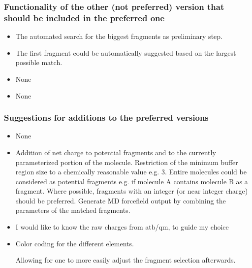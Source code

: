 \subsubsection{Functionality of the other (not preferred) version that should be included in the preferred one}
\begin{itemize}
\item The automated search for the biggest fragments as preliminary step.

\item The first fragment could be automatically suggested based on the largest possible match.

\item None

\item None

\end{itemize}


\subsubsection{Suggestions for additions to the preferred versions}
\begin{itemize}
\item None

\item Addition of net charge to potential fragments and to the currently parameterized portion of the molecule. Restriction of the minimum buffer region size to a chemically reasonable value e.g. 3. Entire molecules could be considered as potential fragments e.g. if molecule A contains molecule B as a fragment. Where possible, fragments with an integer (or near integer charge) should be preferred. Generate MD forcefield output by combining the parameters of the matched fragments.

\item I would like to know the raw charges from atb/qm, to guide my choice

\item Color coding for the different elements.



Allowing for one to more easily adjust the fragment selection afterwards.

\end{itemize}


